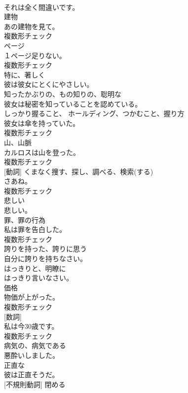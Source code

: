 \documentclass[8pt]{extreport}
\begin{document}
\begin{CJK}{UTF8}{min}
\\	それは全く間違いです。	
\\	[名詞]	建物	
\\	あの建物を見て。	
\\	複数形チェック
\\	[名詞]	ページ	
\\	１ページ足りない。	
\\	複数形チェック
\\	[副詞]	特に、著しく	
\\	彼は彼女にとくにやさしい。	
\\	[形容詞]	知ったかぶりの、もの知りの、聡明な	
\\	彼女は秘密を知っていることを認めている。	
\\	[名詞]	しっかり握ること、 ホールディング、つかむこと、握り方	
\\	彼女は傘を持っていた。	
\\	複数形チェック
\\	[名詞]	山、山脈	
\\	カルロスは山を登った。	
\\	複数形チェック
\\	[名詞] [動詞]	くまなく捜す、探し、調べる、検索(する)	
\\	さあね。	
\\	複数形チェック
\\	[形容詞]	悲しい	
\\	悲しい。	
\\	[名詞]	罪、罪の行為	
\\	私は罪を告白した。	
\\	複数形チェック
\\	[形容詞]	誇りを持った、誇りに思う	
\\	自分に誇りを持ちなさい。	
\\	[副詞]	はっきりと、明瞭に	
\\	はっきり言いなさい。	
\\	[名詞]	価格	
\\	物価が上がった。	
\\	複数形チェック
\\	[名詞] [数詞]	
\\	私は今30歳です。	
\\	複数形チェック
\\	[形容詞]	病気の、病気である	
\\	悪酔いしました。	
\\	[形容詞]	正直な	
\\	彼は正直そうだ。	
\\	[動詞] [不規則動詞]	閉める	

\end{CJK}
\end{document}
